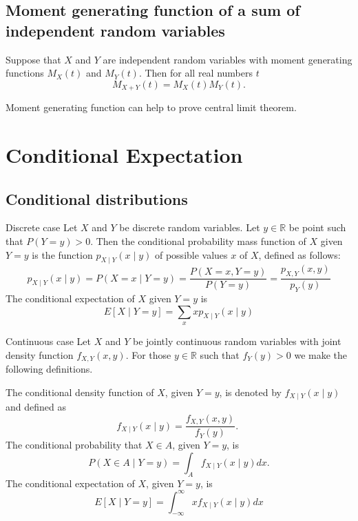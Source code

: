 \documentclass[11pt]{elegantbook}
\begin{document}
\section{Moment generating function of a sum of independent random variables}

\begin{theorem}
 Suppose that $X$ and $Y$ are independent random variables with moment generating functions $M_X(t)$ and $M_Y(t)$. Then for all real numbers $t$
$$
M_{X+Y}(t)=M_X(t) M_Y(t) .
$$
\end{theorem}

\begin{note}
    Moment generating function can help to prove central limit theorem.
\end{note}

\chapter{Conditional Expectation}
\section{Conditional distributions}
\begin{definition}{Discrete case}
 Let $X$ and $Y$ be discrete random variables. Let $y \in \mathbb{R}$ be point such that $P(Y=y)>0$. Then the conditional probability mass function of $X$ given $Y=y$ is the function $p_{X \mid Y}(x \mid y)$ of possible values $x$ of $X$, defined as follows:
$$
p_{X \mid Y}(x \mid y)=P(X=x \mid Y=y)=\frac{P(X=x, Y=y)}{P(Y=y)}=\frac{p_{X, Y}(x, y)}{p_Y(y)}
$$
The conditional expectation of $X$ given $Y=y$ is
$$
E[X \mid Y=y]=\sum_x x p_{X \mid Y}(x \mid y)
$$
\end{definition}
\begin{definition}{Continuous case}
Let $X$ and $Y$ be jointly continuous random variables with joint density function $f_{X, Y}(x, y)$. For those $y \in \mathbb{R}$ such that $f_Y(y)>0$ we make the following definitions.

The conditional density function of $X$, given $Y=y$, is denoted by $f_{X \mid Y}(x \mid y)$ and defined as
$$
f_{X \mid Y}(x \mid y)=\frac{f_{X, Y}(x, y)}{f_Y(y)} \text {. }
$$
The conditional probability that $X \in A$, given $Y=y$, is
$$
P(X \in A \mid Y=y)=\int_A f_{X \mid Y}(x \mid y) d x .
$$
The conditional expectation of $X$, given $Y=y$, is
$$
E[X \mid Y=y]=\int_{-\infty}^{\infty} x f_{X \mid Y}(x \mid y) d x
$$
\end{definition}
\end{document}
